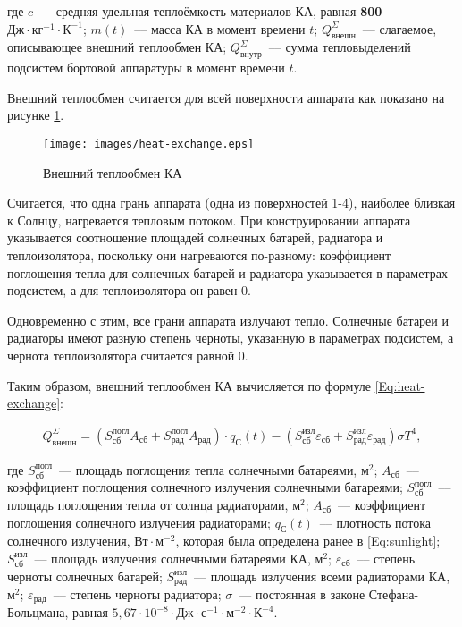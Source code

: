 \documentclass[12pt,a4paper]{article}
\begin{document}
где $c$~--- средняя удельная теплоёмкость материалов КА, равная \textbf{800 $\text{Дж}
  \cdot \text{кг}^{-1} \cdot \text{К}^{-1}$}; $m(t)$~--– масса КА в момент времени $t$;
$Q^{\Sigma}_{\text{внешн}}$~--- слагаемое, описывающее внешний теплообмен КА;
$Q^{\Sigma}_{\text{внутр}}$~--– сумма тепловыделений подсистем бортовой аппаратуры в
момент времени $t$.

Внешний теплообмен считается для всей поверхности аппарата как показано на рисунке \ref{Pic:heat-exchange}.

\begin{figure}[tbh]
  \begin{center}
    \texttt{[image: images/heat-exchange.eps]}
    \caption{Внешний теплообмен КА}
    \label{Pic:heat-exchange}
  \end{center}
\end{figure}

Считается, что одна грань аппарата (одна из поверхностей 1-4), наиболее близкая к Солнцу,
нагревается тепловым потоком. При конструировании аппарата указывается соотношение
площадей солнечных батарей, радиатора и теплоизолятора, поскольку они нагреваются
по-разному: коэффициент поглощения тепла для солнечных батарей и радиатора указывается в
параметрах подсистем, а для теплоизолятора он равен 0.

Одновременно с этим, все грани аппарата излучают тепло. Солнечные батареи и радиаторы
имеют разную степень черноты, указанную в параметрах подсистем, а чернота теплоизолятора
считается равной 0.

Таким образом, внешний теплообмен КА вычисляется по формуле \ref{Eq:heat-exchange}:

\begin{eqnarray}
  Q^{\Sigma}_{\text{внешн}} = \left(S_{\text{сб}}^{\text{погл}} A_{\text{сб}} +
  S_{\text{рад}}^{\text{погл}} A_{\text{рад}}\right) \cdot q_{\text{С}}(t) -
  \left(S_{\text{сб}}^{\text{изл}} \varepsilon_{\text{сб}} + S_{\text{рад}}^{\text{изл}}
  \varepsilon_{\text{рад}}\right)
  \sigma T^4, \label{Eq:heat-exchange}
\end{eqnarray}

где $S_{\text{сб}}^{\text{погл}}$~--- площадь поглощения тепла солнечными батареями,
$\text{м}^2$; $A_{\text{сб}}$~--– коэффициент поглощения солнечного излучения солнечными
батареями; $S_{\text{сб}}^{\text{погл}}$~--– площадь поглощения тепла от солнца
радиаторами, $\text{м}^2$; $A_{\text{сб}}$~--– коэффициент поглощения солнечного излучения
радиаторами; $q_{\text{С}}(t)$~--– плотность потока солнечного излучения, $\text{Вт} \cdot
\text{м}^{-2}$, которая была определена ранее в \ref{Eq:sunlight};
$S_{\text{сб}}^{\text{изл}}$~--- площадь излучения солнечными батареями КА, $\text{м}^2$; $\varepsilon_{\text{сб}}$~--–
степень черноты солнечных батарей; $S_{\text{рад}}^{\text{изл}}$~--– площадь излучения
всеми радиаторами КА, $\text{м}^2$; $\varepsilon_{\text{рад}}$~--– степень черноты радиатора; $\sigma$~--- постоянная в законе
Стефана-Больцмана, равная $5,67 \cdot 10^{-8} \cdot \text{Дж} \cdot \text{с}^{-1} \cdot
\text{м}^{-2} \cdot \text{К}^{-4}$.
\end{document}
